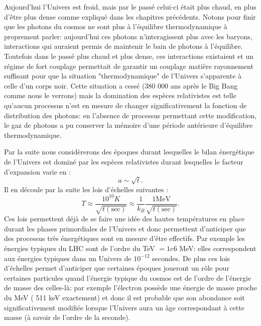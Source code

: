 Aujourd'hui l'Univers est froid, mais par le passé celui-ci était plus chaud, en plus d'être plus dense comme expliqué dans les chapitres précédents. Notons pour finir que les photons du cosmos ne sont plus à l'équilibre thermodynamique à proprement parler: aujourd'hui ces photons n'interagissent plus avec les baryons, interactions qui auraient permis de maintenir le bain de photons à l'équilibre. Toutefois dans le passé plus chaud et plus dense, ces interactions existaient et un régime de fort couplage permettait de garantir un couplage matière rayonnement suffisant pour que la situation "thermodynamique" de l'Univers s'apparente à celle d'un corps noir. Cette situation a cessé (380 000 ans après le Big Bang comme nous le verrons) mais la domination des espèces relativistes est telle qu'aucun processus n'est en mesure de changer significativement la fonction de distribution des photons: en l'absence de processus permettant cette modification, le gaz de photons a pu conserver la mémoire d'une période antérieure d'équilibre thermodynamique.

Par la suite nous considèrerons des époques durant lesquelles le bilan énergétique de l'Univers est dominé par les espèces relativistes durant lesquelles le facteur d'expansion varie en :
\begin{equation}
a\sim \sqrt t.
\end{equation}
Il en découle par la suite les lois d'échelles suivantes :
\begin{equation}
T\approx\frac{10^{10} K}{\sqrt{t\mathrm{(sec)}}} \approx \frac{1}{k_B}\frac{1 \mathrm{MeV}}{\sqrt{t\mathrm{(sec)}}}.
\end{equation}
Ces lois permettent déjà de se faire une idée des hautes températures en place durant les phases primordiales de l'Univers et donc permettent d'anticiper que des processus très énergétiques sont en mesure d'être effectifs. Par exemple les énergies typiques du LHC sont de l'ordre du TeV $=1e6$ MeV: elles correspondent aux énergies typiques dans un Univers de $10^{-12}$ secondes. De plus ces lois d'échelles permet d'anticiper que certaines époques joueront un rôle pour certaines particules quand l'énergie typique du cosmos est de l'ordre de l'énergie de masse des celles-là: par exemple l'électron possède une énergie de masse proche du MeV ( 511 keV exactement) et donc il est probable que son abondance soit significativement modifiée lorsque l'Univers aura un âge correspondant à cette masse (à savoir de l'ordre de la seconde).


